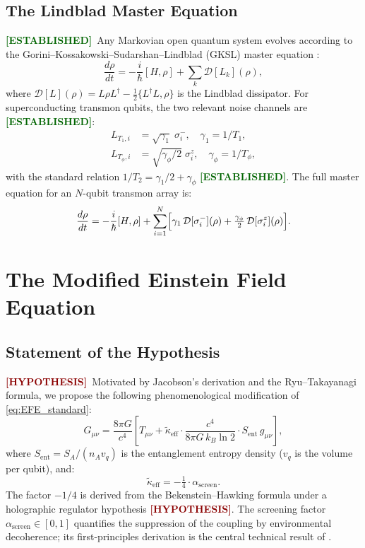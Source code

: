 \documentclass[12pt,a4paper]{article}
\newcommand{\EST}{\textcolor{darkgreen}{\textbf{[ESTABLISHED]}}}
\newcommand{\HYP}{\textcolor{darkred}{\textbf{[HYPOTHESIS]}}}
\theoremstyle{monette}
\theoremstyle{definition}
\newcommand{\SA}{S_A}
\newcommand{\asc}{\alpha_{\mathrm{screen}}}
\newcommand{\keff}{\tilde{\kappa}_{\mathrm{eff}}}
\newcommand{\gamone}{\gamma_1}
\newcommand{\gamphi}{\gamma_\phi}
\newcommand{\Tone}{T_1}
\newcommand{\Tphi}{T_\phi}
\newcommand{\Diss}{\mathcal{D}}
\newcommand{\Sent}{S_{\mathrm{ent}}}
\begin{document}
\subsection{The Lindblad Master Equation}
\label{sec:lindblad_bg}

\EST\ Any Markovian open quantum system evolves according to the
Gorini--Kossakowski--Sudarshan--Lindblad (GKSL) master equation
\cite{Lindblad1976, GKS1976}:
\begin{equation}
  \frac{d\rho}{dt} = -\frac{i}{\hbar}[H,\rho]
    + \sum_k \Diss[L_k](\rho),
  \label{eq:lindblad}
\end{equation}
where $\Diss[L](\rho) = L\rho L^\dagger - \frac{1}{2}\{L^\dagger L,\rho\}$
is the Lindblad dissipator. For superconducting transmon qubits, the two
relevant noise channels are \EST:
\begin{align}
  L_{T_1,i}   &= \sqrt{\gamone}\;\sigma_i^-,
    \quad \gamone = 1/\Tone, \label{eq:L_T1}\\
  L_{T_\phi,i} &= \sqrt{\gamphi/2}\;\sigma_i^z,
    \quad \gamphi = 1/\Tphi, \label{eq:L_Tphi}
\end{align}
with the standard relation $1/T_2 = \gamone/2 + \gamphi$ \EST.
The full master equation for an $N$-qubit transmon array is:
\begin{equation}
  \frac{d\rho}{dt} = -\frac{i}{\hbar}[H,\rho]
    + \sum_{i=1}^{N}\Bigl[\gamone\,\Diss[\sigma_i^-](\rho)
    + \tfrac{\gamphi}{2}\,\Diss[\sigma_i^z](\rho)\Bigr].
  \label{eq:transmon_lindblad}
\end{equation}

\section{The Modified Einstein Field Equation}
\label{sec:hypothesis}

\subsection{Statement of the Hypothesis}
\label{sec:EFE_hypothesis}

\HYP\ Motivated by Jacobson's derivation and the Ryu--Takayanagi formula,
we propose the following phenomenological modification of
\cref{eq:EFE_standard}:
\begin{equation}
  \boxed{
    G_{\mu\nu} = \frac{8\pi G}{c^4}
    \left[T_{\mu\nu}
      + \keff\cdot\frac{c^4}{8\pi G\,k_B\ln 2}\cdot\Sent\,g_{\mu\nu}
    \right],
  }
  \label{eq:EFE_modified}
\end{equation}
where $\Sent = \SA/(n_A v_q)$ is the entanglement entropy density ($v_q$ is
the volume per qubit), and:
\begin{equation}
  \keff = -\tfrac{1}{4}\cdot\asc.
  \label{eq:keff}
\end{equation}
The factor $-1/4$ is derived from the Bekenstein--Hawking formula
under a holographic regulator hypothesis \HYP.
The screening factor $\asc \in [0,1]$ quantifies the suppression of the
coupling by environmental decoherence; its first-principles derivation is the
central technical result of .
\end{document}
